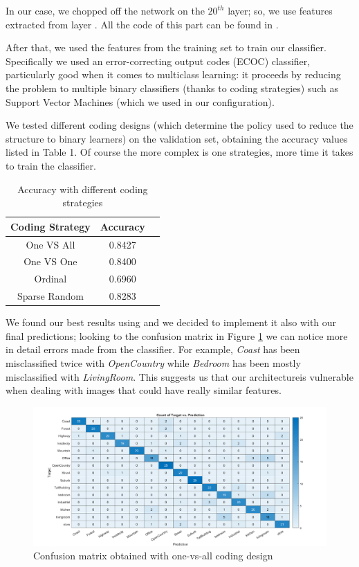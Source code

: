 In our case, we chopped off the network on the $20^{th}$ layer; so, we use features extracted from layer . All the code of this part can be found in . 

After that, we used the features from the training set to train our classifier. Specifically we used an error-correcting output codes (ECOC) classifier, particularly good when it comes to multiclass learning: it proceeds by reducing the problem to multiple binary classifiers (thanks to coding strategies) such as Support Vector Machines (which we used in our configuration). 

We tested different coding designs (which determine the policy used to reduce the structure to binary learners) on the validation set, obtaining the accuracy values listed in Table 1. Of course the more complex is one strategies, more time it takes to train the classifier. 

\begin{table}[h]
	\centering
	\begin{tabular}{|c|c|c|}
		\hline
		\textbf{Coding Strategy}  & \textbf{Accuracy} \\ \hline
		One VS All & 0.8427           \\ \hline
		One VS One & 0.8400 \\ \hline
		Ordinal & 0.6960 \\ \hline
		Sparse Random & 0.8283 \\ \hline
	\end{tabular}
	\caption{Accuracy with different coding strategies}
	\label{tab:MSE}
\end{table}

We found our best results using  and we decided to implement it also with our final predictions; looking to the confusion matrix in Figure \ref{fig:heat} we can notice more in detail errors made from the classifier. For example, \textit{Coast} has been misclassified twice with \textit{OpenCountry} while \textit{Bedroom} has been mostly misclassified with \textit{LivingRoom}. This suggests us that our architectureis vulnerable when dealing with images that could have really similar features.  

\begin{figure}[!htbp] 
	\centering
	\includegraphics[width=1\linewidth]{img/heatmap}
	\caption{Confusion matrix obtained with one-vs-all coding design}
	\label{fig:heat}
\end{figure}